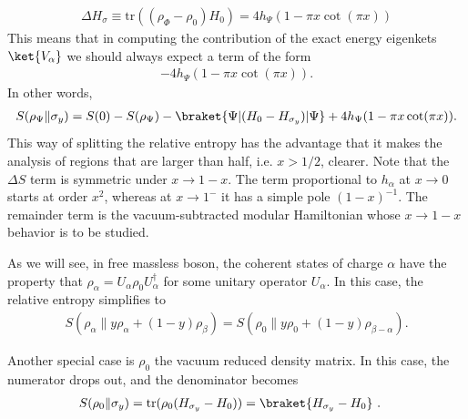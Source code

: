 \documentclass[11pt]{article}
\newcommand{\tr}{\mathrm{tr}}
\newcommand{\nn}{\nonumber}
\begin{document}
\begin{align}
\Delta H_\sigma\equiv \text{tr}((\rho_\Phi-\rho_0)H_0)=4h_{\Psi}(1-\pi x\cot(\pi x))
\end{align}
This means that in computing the contribution of the exact energy eigenkets $\ket{V_\alpha}$ we should always expect a term of the form
\begin{align}
  -4h_{\Psi}(1-\pi x\cot(\pi x)).
\end{align}
In other words,
\begin{align}
S(\rho_\Psi\|\sigma_y)=S(0)-S(\rho_\Psi)-\braket{\Psi|(H_0-H_{\sigma_y})|\Psi}+4h_\Psi(1-\pi x\cot(\pi x)).
\end{align}
This way of splitting the relative entropy has the advantage that it makes the analysis of regions that are larger than half, i.e. $x>1/2$, clearer. Note that the $\Delta S$ term is symmetric under $x\to 1-x$. The term proportional to $h_\alpha$ at $x\to 0$ starts at order $x^2$, whereas at $x\to 1^-$ it has a simple pole $(1-x)^{-1}$. The remainder term is the vacuum-subtracted modular Hamiltonian whose $x\to 1-x$ behavior is to be studied. 

As we will see, in free massless boson, the coherent states of charge $\alpha$ have the property that $\rho_\alpha=U_\alpha \rho_0 U_\alpha^\dagger$ for some unitary operator $U_\alpha$. In this case, the relative entropy simplifies to
\begin{align}
S(\rho_\alpha\|y\rho_\alpha+(1-y)\rho_\beta)=S(\rho_0\|y\rho_0+(1-y)\rho_{\beta-\alpha}).
\end{align}



Another special case is $\rho_0$ the vacuum reduced density matrix. In this case, the numerator drops out, and the denominator becomes
\begin{align}
S(\rho_0\|\sigma_y)&=\tr(\rho_0(H_{\sigma_y}-H_0))=\braket{H_{\sigma_y}-H_0}\ .
\end{align}
\end{document}
